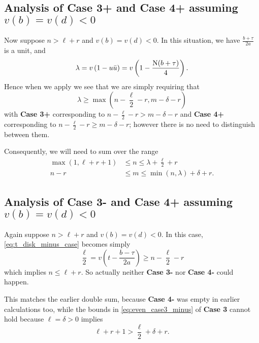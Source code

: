 \subsection{Analysis of Case 3\ts+ and Case 4\ts+ assuming $v(b) = v(d) < 0$}
Now suppose $n > \ell + r$ and $v(b) = v(d) < 0$.
In this situation, we have $\frac{b+\tau}{2a}$ is a unit, and
\[ \lambda =v\left( 1 - u \bar u \right) =  v\left( 1 - \frac{\operatorname{N}(b+\tau)}{4} \right). \]
Hence when we apply  we see that we are simply requiring that
\[ \lambda \ge \max\left( n - \frac{\ell}{2} - r, m - \delta - r \right) \]
with \textbf{Case 3\ts+} corresponding to
$n - \frac{\ell}{2} - r > m - \delta - r$
and \textbf{Case 4\ts+} corresponding to
$n - \frac{\ell}{2} - r \ge m - \delta - r$;
however there is no need to distinguish between them.

Consequently, we will need to sum over the range
\begin{equation}
  \begin{aligned}
    \max(1, \ell + r + 1) &\leq n \leq \lambda + \frac{\ell}{2} + r \\
    n - r &\leq m \leq \min(n, \lambda) + \delta + r.
  \end{aligned}
  \label{eq:even_ell_neg}
\end{equation}


\subsection{Analysis of Case 3\ts- and Case 4\ts+ assuming $v(b) = v(d) < 0$}
Again suppose $n > \ell + r$ and $v(b) = v(d) < 0$.
In this case, \eqref{eq:t_disk_minus_case} becomes simply
\[ \frac{\ell}{2} = v\left( t - \frac{b-\tau}{2a} \right) \ge n - \frac{\ell}{2} - r \]
which implies $n \le \ell + r$.
So actually neither \textbf{Case 3\ts-} nor \textbf{Case 4\ts-} could happen.

This matches the earlier double sum, because \textbf{Case 4\ts-}
was empty in earlier calculations too,
while the bounds in \eqref{eq:even_case3_minus} of \textbf{Case 3\ts{-}}
cannot hold because $\ell = \delta > 0$ implies
\[ \ell + r + 1 > \frac{\ell}{2} + \delta + r. \]
